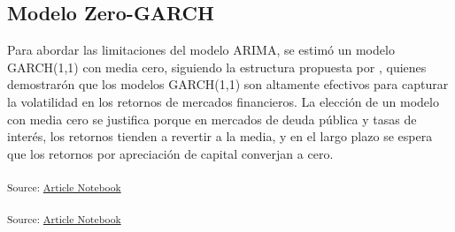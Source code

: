 \documentclass[
  number,
  preprint,
  3p,
  onecolumn]{elsarticle}
\begin{document}
\subsection{Modelo Zero-GARCH}\label{modelo-zero-garch}

Para abordar las limitaciones del modelo ARIMA, se estimó un modelo
GARCH(1,1) con media cero, siguiendo la estructura propuesta por
\citep{miah_rahman_2016}, quienes demostrarón que los modelos GARCH(1,1)
son altamente efectivos para capturar la volatilidad en los retornos de
mercados financieros. La elección de un modelo con media cero se
justifica porque en mercados de deuda pública y tasas de interés, los
retornos tienden a revertir a la media, y en el largo plazo se espera
que los retornos por apreciación de capital converjan a cero.
\citep{fabozzi_fixed_income}

\textsubscript{Source:
\href{https://iancont.github.io/fixed_income_garch/index.qmd.html}{Article
Notebook}}

\label{garch-model-fitting}
\textsubscript{Source:
\href{https://iancont.github.io/fixed_income_garch/index.qmd.html}{Article
Notebook}}
\end{document}
